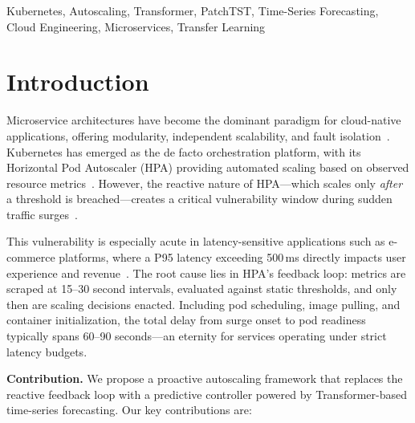 \documentclass[conference]{IEEEtran}
\begin{document}
\begin{IEEEkeywords}
Kubernetes, Autoscaling, Transformer, PatchTST, Time-Series Forecasting, Cloud Engineering, Microservices, Transfer Learning
\end{IEEEkeywords}

\section{Introduction}

Microservice architectures have become the dominant paradigm for cloud-native applications, offering modularity, independent scalability, and fault isolation~\cite{dragoni2017microservices}. Kubernetes has emerged as the de facto orchestration platform, with its Horizontal Pod Autoscaler (HPA) providing automated scaling based on observed resource metrics~\cite{burns2016borg}. However, the reactive nature of HPA---which scales only \textit{after} a threshold is breached---creates a critical vulnerability window during sudden traffic surges~\cite{nguyen2022survey}.

This vulnerability is especially acute in latency-sensitive applications such as e-commerce platforms, where a P95 latency exceeding 500\,ms directly impacts user experience and revenue~\cite{amazon_latency}. The root cause lies in HPA's feedback loop: metrics are scraped at 15--30 second intervals, evaluated against static thresholds, and only then are scaling decisions enacted. Including pod scheduling, image pulling, and container initialization, the total delay from surge onset to pod readiness typically spans 60--90 seconds---an eternity for services operating under strict latency budgets.

\textbf{Contribution.} We propose a proactive autoscaling framework that replaces the reactive feedback loop with a predictive controller powered by Transformer-based time-series forecasting. Our key contributions are:
\end{document}
